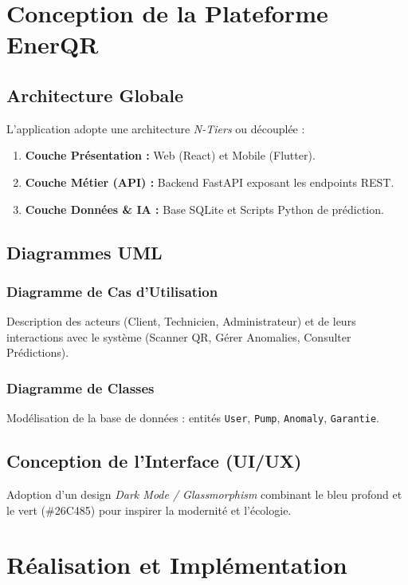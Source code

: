 \documentclass[12pt, a4paper, twoside]{report}
\begin{document}
\chapter{Conception de la Plateforme EnerQR}

\section{Architecture Globale}
L'application adopte une architecture \textit{N-Tiers} ou découplée :
\begin{enumerate}
    \item \textbf{Couche Présentation :} Web (React) et Mobile (Flutter).
    \item \textbf{Couche Métier (API) :} Backend FastAPI exposant les endpoints REST.
    \item \textbf{Couche Données \& IA :} Base SQLite et Scripts Python de prédiction.
\end{enumerate}

\section{Diagrammes UML}
\subsection{Diagramme de Cas d'Utilisation}
Description des acteurs (Client, Technicien, Administrateur) et de leurs interactions avec le système (Scanner QR, Gérer Anomalies, Consulter Prédictions).

\subsection{Diagramme de Classes}
Modélisation de la base de données : entités \texttt{User}, \texttt{Pump}, \texttt{Anomaly}, \texttt{Garantie}.

\section{Conception de l'Interface (UI/UX)}
Adoption d'un design \textit{Dark Mode / Glassmorphism} combinant le bleu profond et le vert (\#26C485) pour inspirer la modernité et l'écologie.

\chapter{Réalisation et Implémentation}
\end{document}
